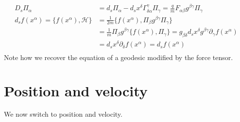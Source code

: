 \documentclass[11pt]{article}
\begin{document}
\begin{equation}
\begin{aligned}
D_s \Pi_\alpha &= d_s \Pi_\alpha - d_sx^\delta \Gamma^\gamma_{\delta\alpha} \Pi_\gamma = \frac{q}{m} F_{\alpha\beta} g^{\beta\gamma} \Pi_\gamma \\
d_s f(x^\alpha) =\{f(x^\alpha), \mathcal{H}\} &= \frac{1}{2m} \{f(x^\alpha), \Pi_\beta g^{\beta\gamma} \Pi_\gamma\} \\
&= \frac{1}{m} \Pi_\beta g^{\beta\gamma} \{f(x^\alpha), \Pi_\gamma\} = g_{\beta\delta} d_s x^\delta g^{\beta\gamma} \partial_\gamma f(x^\alpha) \\
&= d_s x^\delta \partial_\delta f(x^\alpha) = d_s f(x^\alpha) \\
\end{aligned}
\end{equation}
Note how we recover the equation of a geodesic modified by the force tensor.

\section{Position and velocity}
We now switch to position and velocity.
\end{document}
